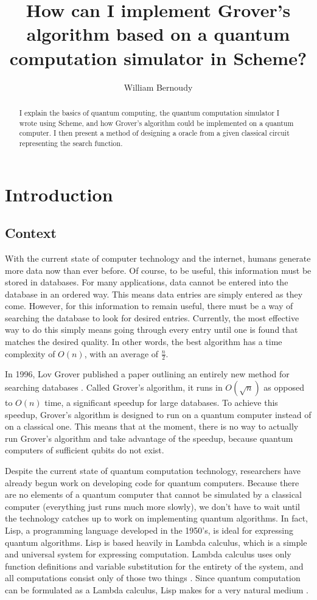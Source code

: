 \documentclass[11pt]{article}
\title{\textbf{How can I implement Grover's algorithm based on a quantum computation simulator in Scheme?}}
\author{William Bernoudy}
\date{}
\begin{document}
\maketitle

\begin{abstract}
I explain the basics of quantum computing, the quantum computation simulator I wrote using Scheme, and how Grover's algorithm could be implemented on a quantum computer. I then present a method of designing a oracle from a given classical circuit representing the search function.
\end{abstract}
\section{Introduction}

\subsection{Context}

With the current state of computer technology and the internet, humans generate more data now than ever before. Of course, to be useful, this information must be stored in databases. For many applications, data cannot be entered into the database in an ordered way. This means data entries are simply entered as they come. However, for this information to remain useful, there must be a way of searching the database to look for desired entries. Currently, the most effective way to do this simply means going through every entry until one is found that matches the desired quality. In other words, the best algorithm has a time complexity of $O(n)$, with an average of $\frac{n}{2}$.

In 1996, Lov Grover published a paper outlining an entirely new method for searching databases \cite{grover96}. Called Grover's algorithm, it runs in $O(\sqrt{n})$ as opposed to $O(n)$ time, a significant speedup for large databases. To achieve this speedup, Grover's algorithm is designed to run on a quantum computer instead of on a classical one. This means that at the moment, there is no way to actually run Grover's algorithm and take advantage of the speedup, because quantum computers of sufficient qubits do not exist.

Despite the current state of quantum computation technology, researchers have already begun work on developing code for quantum computers. Because there are no elements of a quantum computer that cannot be simulated by a classical computer (everything just runs much more slowly), we don't have to wait until the technology catches up to work on implementing quantum algorithms. In fact, Lisp, a programming language developed in the 1950's, is ideal for expressing quantum algorithms. Lisp is based heavily in Lambda calculus, which is a simple and universal system for expressing computation. Lambda calculus uses only function definitions and variable substitution for the entirety of the system, and all computations consist only of those two things \cite{rojas04}. Since quantum computation can be formulated as a Lambda calculus, Lisp makes for a very natural medium \cite{tonder04}.
\end{document}
